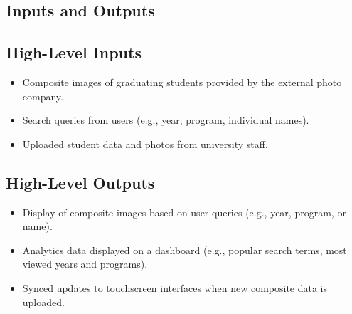 \documentclass{article}
\begin{document}
\subsection{Inputs and Outputs}

\subsection*{High-Level Inputs}
\begin{itemize}
    \item Composite images of graduating students provided by the external photo company.
    \item Search queries from users (e.g., year, program, individual names).
    \item Uploaded student data and photos from university staff.
\end{itemize}

\subsection*{High-Level Outputs}
\begin{itemize}
    \item Display of composite images based on user queries (e.g., year, program, or name).
    \item Analytics data displayed on a dashboard (e.g., popular search terms, most viewed years and programs).
    \item Synced updates to touchscreen interfaces when new composite data is uploaded.
\end{itemize}
\end{document}
